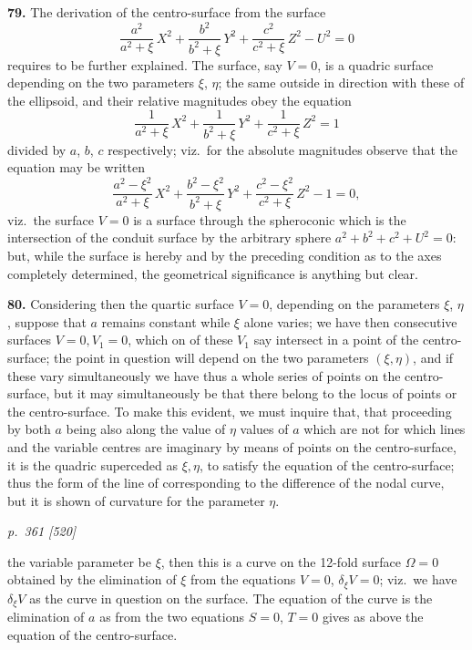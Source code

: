 \documentclass[11pt,a4paper]{article}
\theoremstyle{plain}
\theoremstyle{definition}
\begin{document}
\textbf{79.} The derivation of the centro-surface from the surface
\[
\frac{a^2}{a^2 + \xi}\,X^2 + \frac{b^2}{b^2 + \xi}\,Y^2 + \frac{c^2}{c^2 + \xi}\,Z^2 - U^2 = 0
\]
requires to be further explained. The surface, say $V = 0$, is a quadric surface depending on the two parameters $\xi$, $\eta$; the same outside in direction with these of the ellipsoid, and their relative magnitudes obey the equation
\[
\frac{1}{a^2 + \xi}\,X^2 + \frac{1}{b^2 + \xi}\,Y^2 + \frac{1}{c^2 + \xi}\,Z^2 = 1
\]
divided by $a$, $b$, $c$ respectively; viz.\ for the absolute magnitudes observe that the equation may be written
\[
\frac{a^2 - \xi^2}{a^2 + \xi}\,X^2 + \frac{b^2 - \xi^2}{b^2 + \xi}\,Y^2 + \frac{c^2 - \xi^2}{c^2 + \xi}\,Z^2 - 1 = 0,
\]
viz.\ the surface $V = 0$ is a surface through the spheroconic which is the intersection of the conduit surface by the arbitrary sphere $a^2 + b^2 + c^2 + U^2 = 0$: but, while the surface is hereby and by the preceding condition as to the axes completely determined, the geometrical significance is anything but clear.

\textbf{80.} Considering then the quartic surface $V = 0$, depending on the parameters $\xi$, $\eta$, suppose that $a$ remains constant while $\xi$ alone varies; we have then consecutive surfaces $V = 0, V_1 = 0$, which on of these $V_1$ say intersect in a point of the centro-surface; the point in question will depend on the two parameters $(\xi, \eta)$, and if these vary simultaneously we have thus a whole series of points on the centro-surface, but it may simultaneously be that there belong to the locus of points or the centro-surface. To make this evident, we must inquire that, that proceeding by both $a$ being also along the value of $\eta$ values of $a$ which are not for which lines and the variable centres are imaginary by means of points on the centro-surface, it is the quadric superceded as $\xi, \eta$, to satisfy the equation of the centro-surface; thus the form of the line of corresponding to the difference of the nodal curve, but it is shown of curvature for the parameter $\eta$.

\clearpage

\bigskip
\textit{p.~361 [520]}
\smallskip

the variable parameter be $\xi$, then this is a curve on the 12-fold surface $\Omega = 0$ obtained by the elimination of $\xi$ from the equations $V = 0$, $\delta_\xi V = 0$; viz.\ we have $\delta_\xi V$ as the curve in question on the surface. The equation of the curve is the elimination of $a$ as from the two equations $S = 0$, $T = 0$ gives as above the equation of the centro-surface.
\end{document}
